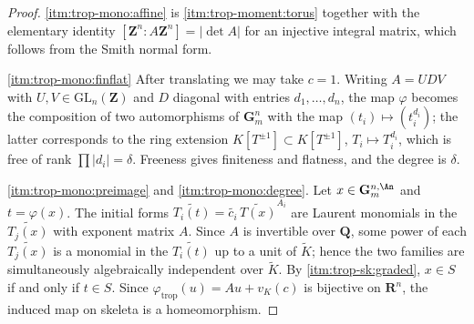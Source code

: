 \begin{proof}
\cref{itm:trop-mono:affine} is 
\cref{itm:trop-moment:torus} together with the elementary identity
$[\mathbf Z^n:A\mathbf Z^n]=|\det A|$ for an injective integral matrix,
which follows from the Smith normal form.

\cref{itm:trop-mono:finflat} After translating we may take $c=1$. Writing
$A=UDV$ with $U,V\in\mathrm{GL}_n(\mathbf Z)$ and $D$ diagonal with entries
$d_1,\ldots,d_n$, the map $\varphi$ becomes the composition of two
automorphisms of $\mathbf G_m^n$ with the map
$(t_i)\mapsto(t_i^{d_i})$; the latter corresponds to the ring extension
$K[T^{\pm1}]\subset K[T^{\pm1}]$, $T_i\mapsto T_i^{d_i}$, which is free of
rank $\prod|d_i|=\delta$. Freeness gives finiteness and flatness, and the
degree is $\delta$.

\cref{itm:trop-mono:preimage} and \cref{itm:trop-mono:degree}. Let
$x\in\mathbf G_m^{n,\An}$ and $t=\varphi(x)$. The initial forms
$\widetilde{T_i(t)}=\widetilde{c_i}\,\widetilde{T(x)}^{A_i}$ are Laurent
monomials in the $\widetilde{T_j(x)}$ with exponent matrix $A$. Since $A$
is invertible over $\mathbf Q$, some power of each $\widetilde{T_j(x)}$
is a monomial in the $\widetilde{T_i(t)}$ up to a unit of $\widetilde K$;
hence the two families are simultaneously algebraically independent over
$\widetilde K$. By 
\cref{itm:trop-sk:graded}, $x\in S$ if and only if $t\in S$. Since
$\varphi_{\mathrm{trop}}(u)=Au+v_K(c)$ is bijective on $\mathbf R^n$, the induced map
on skeleta is a homeomorphism.


\end{proof}
